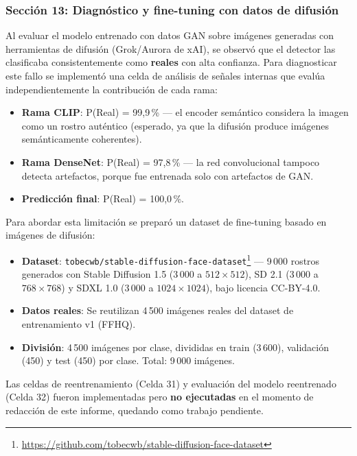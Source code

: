 \documentclass[pdflatex,sn-mathphys-num]{sn-jnl}
\begin{document}
\subsubsection{Sección 13: Diagnóstico y fine-tuning con datos de difusión}\label{subsubsec:diagnostic}

Al evaluar el modelo entrenado con datos GAN sobre imágenes generadas con herramientas de difusión (Grok/Aurora de xAI), se observó que el detector las clasificaba consistentemente como \textbf{reales} con alta confianza. Para diagnosticar este fallo se implementó una celda de análisis de señales internas que evalúa independientemente la contribución de cada rama:

\begin{itemize}
    \item \textbf{Rama CLIP}: P(Real) = 99,9\,\% --- el encoder semántico considera la imagen como un rostro auténtico (esperado, ya que la difusión produce imágenes semánticamente coherentes).
    \item \textbf{Rama DenseNet}: P(Real) = 97,8\,\% --- la red convolucional tampoco detecta artefactos, porque fue entrenada solo con artefactos de GAN.
    \item \textbf{Predicción final}: P(Real) = 100,0\,\%.
\end{itemize}

Para abordar esta limitación se preparó un dataset de fine-tuning basado en imágenes de difusión:

\begin{itemize}
    \item \textbf{Dataset}: \texttt{tobecwb/stable-diffusion-face-dataset}\footnote{\url{https://github.com/tobecwb/stable-diffusion-face-dataset}} --- 9\,000 rostros generados con Stable Diffusion 1.5 (3\,000 a $512\times512$), SD 2.1 (3\,000 a $768\times768$) y SDXL 1.0 (3\,000 a $1024\times1024$), bajo licencia CC-BY-4.0.

    \item \textbf{Datos reales}: Se reutilizan 4\,500 imágenes reales del dataset de entrenamiento v1 (FFHQ).

    \item \textbf{División}: 4\,500 imágenes por clase, divididas en train (3\,600), validación (450) y test (450) por clase. Total: 9\,000 imágenes.
\end{itemize}

Las celdas de reentrenamiento (Celda 31) y evaluación del modelo reentrenado (Celda 32) fueron implementadas pero \textbf{no ejecutadas} en el momento de redacción de este informe, quedando como trabajo pendiente.
\end{document}
